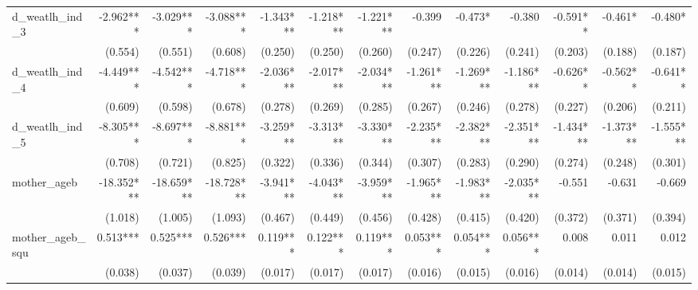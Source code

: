 \begin{tabular}{lrrrrrrrrrrrr}
d\_weatlh\_ind\_3                           &    -2.962*** &    -3.029*** &    -3.088*** &    -1.343*** &    -1.218*** &    -1.221*** &       -0.399 &      -0.473* &       -0.380 &     -0.591** &      -0.461* &      -0.480* \\ 
                                            &      (0.554) &      (0.551) &      (0.608) &      (0.250) &      (0.250) &      (0.260) &      (0.247) &      (0.226) &      (0.241) &      (0.203) &      (0.188) &      (0.187) \\ 
d\_weatlh\_ind\_4                           &    -4.449*** &    -4.542*** &    -4.718*** &    -2.036*** &    -2.017*** &    -2.034*** &    -1.261*** &    -1.269*** &    -1.186*** &     -0.626** &     -0.562** &     -0.641** \\ 
                                            &      (0.609) &      (0.598) &      (0.678) &      (0.278) &      (0.269) &      (0.285) &      (0.267) &      (0.246) &      (0.278) &      (0.227) &      (0.206) &      (0.211) \\ 
d\_weatlh\_ind\_5                           &    -8.305*** &    -8.697*** &    -8.881*** &    -3.259*** &    -3.313*** &    -3.330*** &    -2.235*** &    -2.382*** &    -2.351*** &    -1.434*** &    -1.373*** &    -1.555*** \\ 
                                            &      (0.708) &      (0.721) &      (0.825) &      (0.322) &      (0.336) &      (0.344) &      (0.307) &      (0.283) &      (0.290) &      (0.274) &      (0.248) &      (0.301) \\ 
mother\_ageb                                &   -18.352*** &   -18.659*** &   -18.728*** &    -3.941*** &    -4.043*** &    -3.959*** &    -1.965*** &    -1.983*** &    -2.035*** &       -0.551 &       -0.631 &       -0.669 \\ 
                                            &      (1.018) &      (1.005) &      (1.093) &      (0.467) &      (0.449) &      (0.456) &      (0.428) &      (0.415) &      (0.420) &      (0.372) &      (0.371) &      (0.394) \\ 
mother\_ageb\_squ                           &     0.513*** &     0.525*** &     0.526*** &     0.119*** &     0.122*** &     0.119*** &     0.053*** &     0.054*** &     0.056*** &        0.008 &        0.011 &        0.012 \\ 
                                            &      (0.038) &      (0.037) &      (0.039) &      (0.017) &      (0.017) &      (0.017) &      (0.016) &      (0.015) &      (0.016) &      (0.014) &      (0.014) &      (0.015) \\ 

\end{tabular}
